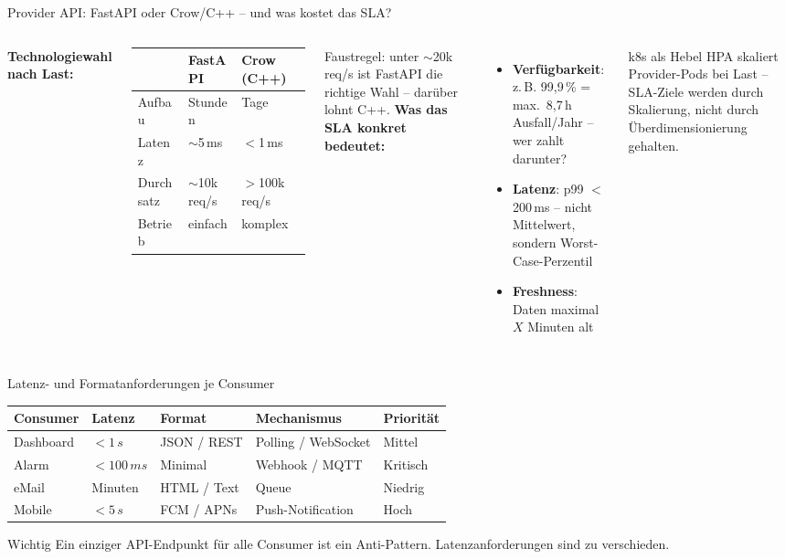 \documentclass[aspectratio=169]{beamer}
\begin{document}
\begin{frame}{Provider API: FastAPI oder Crow/C++ – und was kostet das SLA?}
  \begin{columns}
      \textbf{Technologiewahl nach Last:}
      \begin{tabular}{lll}
        \toprule
        & \textbf{FastAPI} & \textbf{Crow (C++)} \\
        \midrule
        Aufbau    & Stunden  & Tage \\
        Latenz    & $\sim$5\,ms & $<$1\,ms \\
        Durchsatz & $\sim$10k\,req/s & $>$100k\,req/s \\
        Betrieb   & einfach  & komplex \\
        \bottomrule
      \end{tabular}
      \vspace{0.5em}
      Faustregel: unter $\sim$20k\,req/s ist FastAPI die
      richtige Wahl – darüber lohnt C++.
      \textbf{Was das SLA konkret bedeutet:}
      \begin{itemize}
        \item \textbf{Verfügbarkeit}: z.\,B. 99,9\,\% = max.\ 8,7\,h
              Ausfall/Jahr – wer zahlt darunter?
        \item \textbf{Latenz}: p99 $<$ 200\,ms – nicht Mittelwert,
              sondern Worst-Case-Perzentil
        \item \textbf{Freshness}: Daten maximal $X$ Minuten alt
      \end{itemize}
      \vspace{0.3em}
      \begin{block}{k8s als Hebel}
        HPA skaliert Provider-Pods bei Last –
        SLA-Ziele werden durch Skalierung,
        nicht durch Überdimensionierung gehalten.
      \end{block}
  \end{columns}
\end{frame}

\begin{frame}{Latenz- und Formatanforderungen je Consumer}
  \begin{tabular}{lllll}
    \toprule
    \textbf{Consumer} & \textbf{Latenz} & \textbf{Format} &
    \textbf{Mechanismus} & \textbf{Priorität} \\
    \midrule
    Dashboard  & $<1\,s$    & JSON / REST    & Polling / WebSocket & Mittel \\
    Alarm      & $<100\,ms$ & Minimal        & Webhook / MQTT      & Kritisch \\
    eMail      & Minuten    & HTML / Text    & Queue               & Niedrig \\
    Mobile     & $<5\,s$    & FCM / APNs     & Push-Notification   & Hoch \\
    \bottomrule
  \end{tabular}
  \vspace{0.5em}
  \begin{alertblock}{Wichtig}
    Ein einziger API-Endpunkt für alle Consumer ist ein Anti-Pattern.
    Latenzanforderungen sind zu verschieden.
  \end{alertblock}
\end{frame}
\end{document}
